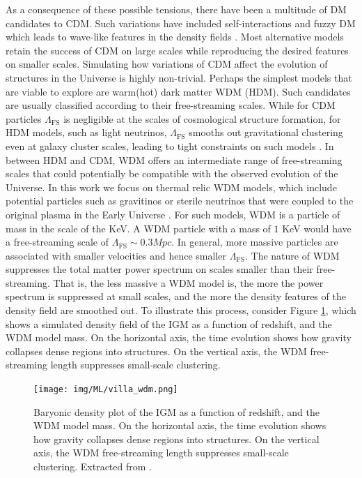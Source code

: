 As a consequence of these possible tensions, there have been a multitude of DM candidates to CDM. Such variations have included self-interactions \cite{Spergel2000} and fuzzy DM which leads to wave-like features in the density fields \cite{Hu2000}. Most alternative models retain the success of CDM on large scales while reproducing the desired features on smaller scales. Simulating how variations of CDM affect the evolution of structures in the Universe is highly non-trivial. Perhaps the simplest models that are viable to explore are warm(hot) dark matter WDM (HDM). Such candidates are usually classified according to their free-streaming scales. While for CDM particles $\Lambda_\mathrm{FS}$ is negligible at the scales of cosmological structure formation, for HDM models, such as light neutrinos, $\Lambda_\mathrm{FS}$ smooths out gravitational clustering even at galaxy cluster scales, leading to tight constraints on such models \cite{Hannestad_2004}. In between HDM and CDM, WDM offers an intermediate range of free-streaming scales that could potentially be compatible with the observed evolution of the Universe. In this work we focus on thermal relic WDM models, which include potential particles such as gravitinos or sterile neutrinos that were coupled to the original plasma in the Early Universe \cite{Viel_2005}. For such models, WDM is a particle of mass in the scale of the KeV. A WDM particle with a mass of $1$ KeV would have a free-streaming scale of $\Lambda_\mathrm{FS} \sim 0.3 Mpc$. In general, more massive particles are associated with smaller velocities and hence smaller $\Lambda_\mathrm{FS}$. The nature of WDM suppresses the total matter power spectrum on scales smaller than their free-streaming. That is, the less massive a WDM model is, the more the power spectrum is suppressed at small scales, and the more the density features of the density field are smoothed out.
To illustrate this process, consider Figure \ref{fig:villasenor_wdm}, which shows a simulated density field of the IGM as a function of redshift, and the WDM model mass. On the horizontal axis, the time evolution shows how gravity collapses dense regions into structures. On the vertical axis, the WDM free-streaming length suppresses small-scale clustering. 

\begin{figure}[ht]
    \centering
    \texttt{[image: img/ML/villa\_wdm.png]}
    \caption{Baryonic density plot of the IGM as a function of redshift, and the WDM model mass. On the horizontal axis, the time evolution shows how gravity collapses dense regions into structures. On the vertical axis, the WDM free-streaming length suppresses small-scale clustering. Extracted from \cite{Villasenor_2023}.}
    \label{fig:villasenor_wdm}
\end{figure}

